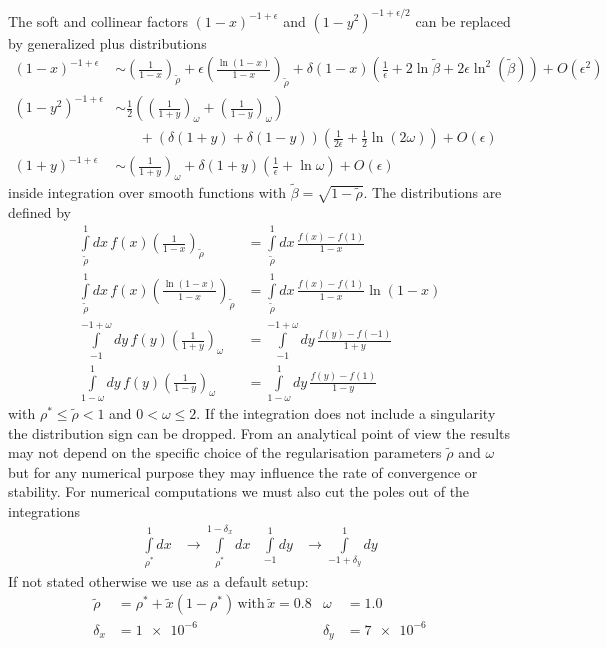 The soft and collinear factors $(1-x)^{-1+\epsilon}$ and $(1-y^2)^{-1+\epsilon/2}$ can be replaced by generalized plus distributions\cite{Harris:1995tu}
\begin{align}
(1-x)^{-1+\epsilon} &\sim \left(\frac 1 {1-x}\right)_{\tilde\rho} + \epsilon \left(\frac{\ln(1-x)}{1-x}\right)_{\tilde \rho} + \delta(1-x)\left(\frac 1 \epsilon + 2\ln\tilde\beta + 2\epsilon\ln^2(\tilde\beta)\right) + O(\epsilon^2)\\
(1-y^2)^{-1+\epsilon} &\sim \frac 1 2\left(\left(\frac 1 {1+y}\right)_\omega + \left(\frac 1 {1-y}\right)_\omega\right) \nonumber\\
 &\hspace{20pt} + \left(\delta(1+y)+\delta(1-y)\right)\left(\frac 1 {2\epsilon} + \frac 1 2\ln(2\omega)\right) + O(\epsilon)\\
(1+y)^{-1+\epsilon} &\sim \left(\frac 1 {1+y}\right)_\omega + \delta(1+y)\left(\frac 1 \epsilon + \ln\omega\right) + O(\epsilon)
\end{align}
inside integration over smooth functions with $\tilde \beta = \sqrt{1-\tilde\rho}$. The distributions are defined by
\begin{align}
\int\limits_{\tilde\rho}^1\!\!dx\,f(x)\left(\frac 1 {1-x}\right)_{\tilde\rho} &= \int\limits_{\tilde\rho}^1\!\!dx\,\frac {f(x) - f(1)} {1-x}\\
\int\limits_{\tilde\rho}^1\!\!dx\,f(x)\left(\frac {\ln(1-x)} {1-x}\right)_{\tilde\rho} &= \int\limits_{\tilde\rho}^1\!\!dx\,\frac {f(x) - f(1)} {1-x}\ln(1-x)\\
\int\limits_{-1}^{-1+\omega}\!\!\!dy\,f(y)\left(\frac 1 {1+y}\right)_{\omega} &= \int\limits_{-1}^{-1+\omega}\!\!\!dy\,\frac {f(y)-f(-1)} {1+y}\\
\int\limits_{1-\omega}^{1}\!\!dy\,f(y)\left(\frac 1 {1-y}\right)_{\omega} &= \int\limits_{1-\omega}^{1}\!\!dy\,\frac {f(y)-f(1)} {1-y}
\end{align}
with $\rho^*\leq\tilde\rho < 1$ and $0<\omega\leq 2$. If the integration does not include a singularity the distribution sign can be dropped. From an analytical point of view the results may not depend on the specific choice of the regularisation parameters $\tilde\rho$ and $\omega$ but for any numerical purpose they may influence the rate of convergence or stability. For numerical computations we must also cut the poles out of the integrations
\begin{align}
\int\limits_{\rho^*}^1\!dx &\rightarrow \int\limits_{\rho^*}^{1-\delta_x}\!\!\!dx &\int\limits_{-1}^1\!dy &\rightarrow \int\limits_{-1+\delta_y}^{1}\!\!dy
\end{align}
If not stated otherwise we use as a default setup:
\begin{align}
\tilde\rho &= \rho^* + \tilde x(1-\rho^*)\,\text{with}\, \tilde x=0.8 &\omega &= 1.0\\
\delta_x &= \num{1e-6} &\delta_y &=\num{7e-6}
\end{align}

